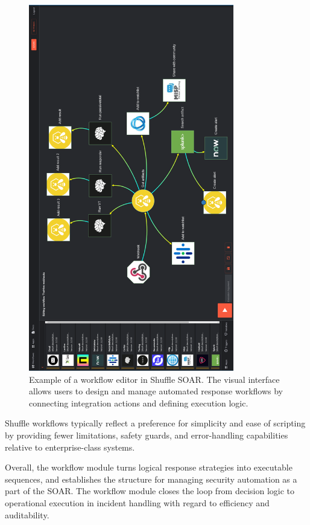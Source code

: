 \begin{figure}[H]
    \centering
    \includegraphics[width=0.8\textwidth,height=0.9\textheight]{images/shuffle_soar_workflow.png}
    \caption[Example of a workflow editor in Shuffle SOAR]{Example of a workflow editor in Shuffle SOAR. The visual interface allows users to design and manage automated response workflows by connecting integration actions and defining execution logic.}
    \label{fig:shuffle-soar-workflow}
\end{figure}

Shuffle workflows typically reflect a preference for simplicity and ease of scripting by providing fewer limitations, safety guards, and error-handling capabilities relative to enterprise-class systems.

Overall, the workflow module turns logical response strategies into executable sequences, and establishes the structure for managing security automation as a part of the SOAR. The workflow module closes the loop from decision logic to operational execution in incident handling with regard to efficiency and auditability.

